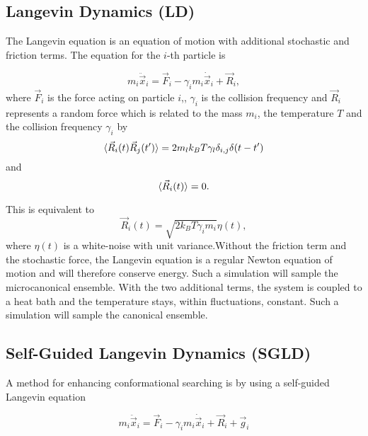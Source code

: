 \documentclass[a4paper]{article}
\begin{document}
\subsection{Langevin Dynamics (LD)}

The Langevin equation is an equation of motion with additional stochastic and friction terms. The equation for the $i$-th particle is

\begin{equation}
m_i \ddot{\vec{x}}_i = \vec{F}_i - \gamma_i m_i \dot{\vec{x}}_i + \vec{R}_i,
\label{eq:langevin_equation}
\end{equation}
where $\vec{F}_i$ is the  force acting on particle $i$,, $\gamma_i$ is the collision frequency and $\vec{R}_i$ represents a random force which is related to the mass $m_i$, the temperature $T$ and the collision frequency $\gamma_i$ by
\begin{equation}
\braket{\vec{R}_i (t) \vec{R}_j (t')} = 2 m_l k_B T \gamma_l \delta_{i,j} \delta (t-t')
\label{eq:random_force_1}
\end{equation}
and
\begin{equation}
\braket{\vec{R}_i (t)} = 0.
\label{eq:random_force_2}
\end{equation}

This is equivalent to
\begin{equation}
\vec{R}_i(t) = \sqrt{2 k_B T \gamma_i m_i} \eta(t)
\label{eq:random_force_3},
\end{equation}
where $\eta(t)$ is a white-noise with unit variance.Without the friction term and the stochastic force, the Langevin equation is a regular Newton equation of motion and will therefore conserve energy. Such a simulation will sample the microcanonical ensemble. With the two additional terms, the system is coupled to a heat bath and the temperature stays, within fluctuations, constant. Such a simulation will sample the canonical ensemble.

\subsection{Self-Guided Langevin Dynamics (SGLD)}

A method for enhancing conformational searching is by using a self-guided Langevin equation~\cite{XiongwuWu2011a}

\begin{equation}
m_i \ddot{\vec{x}}_i = \vec{F}_i - \gamma_i m_i \dot{\vec{x}}_i + \vec{R}_i + \vec{g}_i
\label{eq:self_guided}
\end{equation}
\end{document}
